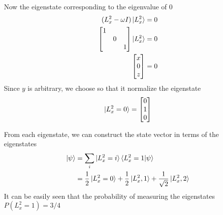 \documentclass[../../../main.tex]{subfiles}
\begin{document}
Now the eigenstate corresponding to the eigenvalue of 0
\begin{align*}
    (L_x^2-\omega I) \ket{L_x^2}&= 0\\
    \begin{bmatrix}
        1&&\\
        &0&\\
        &&1
    \end{bmatrix}
    \ket{L_x^2}&= 0\\
    \begin{bmatrix}
        x\\0\\z
    \end{bmatrix}
    &= 0
\end{align*}
Since $y$ is arbitrary, we choose so that it normalize the eigenstate
\begin{equation*}
    \ket{L_x^2=0}=
    \begin{bmatrix}
        0\\1\\0
    \end{bmatrix}
\end{equation*}

From each eigenstate, we can construct the state vector in terms of the eigenstates
\begin{align*}
    \ket{\psi }&=  \sum_{i} \ket{L_x^2=i}\braket{L_x^2=1|\psi}\\
    &= \frac{1 }{2 }\ket{L_x^2=0}+\frac{1 }{2 }\ket{L_x^2,1}+\frac{1 }{\sqrt{2 }}\ket{L_x^2,2}
\end{align*}
It can be easily seen that the probability of measuring the eigenstates $P(L_x^2=1)=3/4$
\end{document}
